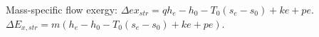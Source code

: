 Mass-specific flow exergy:  
\( \Delta ex_{str} = q h_e - h_0 - T_0 (s_e - s_0) + ke + pe \).  
\( \Delta E_{x,str} = m (h_e - h_0 - T_0 (s_e - s_0) + ke + pe) \).